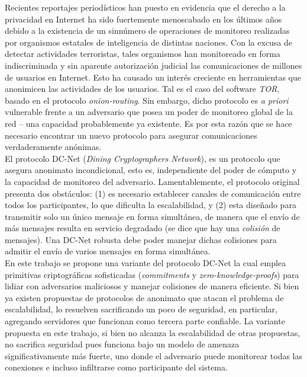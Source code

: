 Recientes reportajes periodísticos han puesto en evidencia que el derecho a la 
privacidad en Internet ha sido fuertemente menoscabado en los últimos años 
debido a la existencia de un sinnúmero de operaciones de monitoreo realizadas 
por organismos estatales de inteligencia de distintas naciones.
Con la excusa de detectar actividades terroristas, tales organismos han 
monitoreado en forma indiscriminada y sin aparente autorización judicial las 
comunicaciones de millones de usuarios en Internet. Esto ha causado un interés 
creciente en herramientas que anonimicen las actividades de los usuarios. 
Tal es el caso del software \emph{TOR}, basado en el protocolo 
\emph{onion-routing}. Sin embargo, dicho protocolo es \emph{a priori} 
vulnerable frente a un adversario que posea un poder de monitoreo global de la 
red -- una capacidad probablemente ya existente. Es por esta razón que se hace 
necesario encontrar un nuevo protocolo para asegurar comunicaciones 
verdaderamente anónimas.\\
El protocolo DC-Net (\emph{Dining Cryptographers Network}), es un protocolo 
que asegura anonimato incondicional, esto es, independiente del poder de 
cómputo y la capacidad de monitoreo del adversario. Lamentablemente, el 
protocolo original presenta dos obstáculos: (1) es necesario establecer 
canales de comunicación entre todos los participantes, lo que dificulta la 
escalabilidad, y (2) esta diseñado para transmitir solo un único mensaje en 
forma simultánea, de manera que el envío de más mensajes resulta en servicio 
degradado (se dice que hay una \emph{colisión} de mensajes). Una DC-Net 
robusta debe poder manejar dichas colisiones para admitir el envío de varios 
mensajes en forma simultánea.\\
En este trabajo se propone una variante del protocolo DC-Net la cual emplea 
primitivas criptográficas sofisticadas (\emph{commitments} y 
\emph{zero-knowledge-proofs}) para lidiar con adversarios maliciosos y manejar 
colisiones de manera eficiente. Si bien ya existen propuestas de protocolos de 
anonimato que atacan el problema de escalabilidad, lo resuelven sacrificando 
un poco de seguridad, en particular, agregando servidores que funcionan como 
tercera parte confiable. La variante propuesta en este trabajo, si bien no 
alcanza la escalabilidad de otras propuestas, no sacrifica seguridad pues 
funciona bajo un modelo de amenaza significativamente más fuerte, uno donde el 
adversario puede monitorear todas las conexiones e incluso infiltrarse como 
participante del sistema.\\
